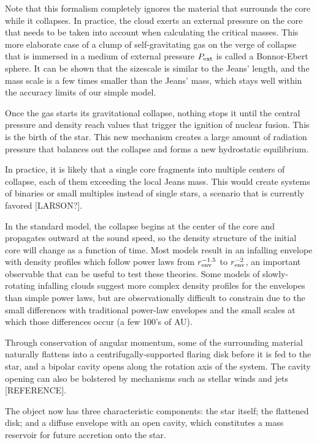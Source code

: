Note that this formalism completely ignores the material that surrounds the core while it collapses. In practice, the cloud exerts an external pressure on the core that needs to be taken into account when calculating the critical masses. This more elaborate case of a clump of self-gravitating gas on the verge of collapse that is immersed in a medium of external pressure $P_\textrm{ext}$ is called a Bonnor-Ebert sphere. It can be shown \citep{McKee:2007bd} that the sizescale is similar to the Jeans' length, and the mass scale is a few times smaller than the Jeans' mass, which stays well within the accuracy limits of our simple model.

Once the gas starts its gravitational collapse, nothing stops it until the central pressure and density reach values that trigger the ignition of nuclear fusion. This is the birth of the star. This new mechanism creates a large amount of radiation pressure that balances out the collapse and forms a new hydrostatic equilibrium. 

In practice, it is likely that a single core fragments into multiple centers of collapse, each of them exceeding the local Jeans mass. This would create systems of binaries or small multiples instead of single stars, a scenario that is currently favored [LARSON?].

In the standard model, the collapse begins at the center of the core and propagates outward at the sound speed, so the density structure of the initial core will change as a function of time. Most models result in an infalling envelope with density profiles which follow power laws from $r_\textrm{env}^{-1.5}$ to $r_\textrm{env}^{-2}$, an important observable that can be useful to test these theories. Some models of slowly-rotating infalling clouds suggest more complex density profiles for the envelopes \citep[e.g.][]{Ulrich:1976ho,Terebey:1984hi} than simple power laws, but are observationally difficult to constrain due to the small differences with traditional power-law envelopes and the small scales at which those differences occur (a few 100's of AU).

Through conservation of angular momentum, some of the surrounding material naturally flattens into a centrifugally-supported flaring disk before it is fed to the star, and a bipolar cavity opens along the rotation axis of the system. The cavity opening can also be bolstered by mechanisms such as stellar winds and jets [REFERENCE].

The object now has three characteristic components: the star itself; the flattened disk; and a diffuse envelope with an open cavity, which constitutes a mass reservoir for future accretion onto the star.

